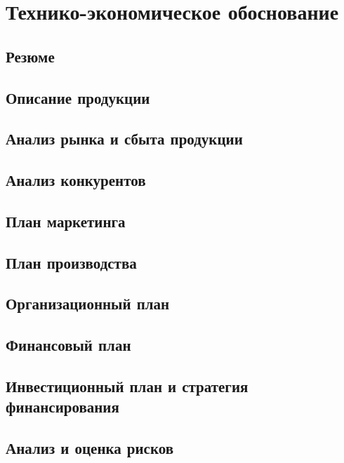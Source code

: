\chapter{Технико-экономическое обоснование}
\section{Резюме}
\section{Описание продукции}
\section{Анализ рынка и сбыта продукции}
\section{Анализ конкурентов}
\section{План маркетинга}
\section{План производства}
\section{Организационный план}
\section{Финансовый план}
\section{Инвестиционный план и стратегия финансирования}	
\section{Анализ и оценка рисков}
